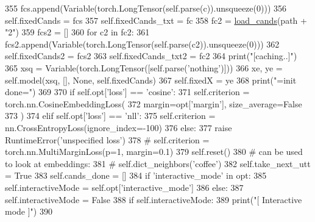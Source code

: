 \begin{DoxyCode}
355                     fcs.append(Variable(torch.LongTensor(self.parse(c)).unsqueeze(0)))
356                 self.fixedCands = fcs
357                 self.fixedCands\_txt = fc
358                 fc2 = \hyperlink{namespaceprojects_1_1personachat_1_1kvmemnn_1_1kvmemnn_a7f44d8ff34857c26b87223a668c43724}{load\_cands}(path + \textcolor{stringliteral}{"2"})
359                 fcs2 = []
360                 \textcolor{keywordflow}{for} c2 \textcolor{keywordflow}{in} fc2:
361                     fcs2.append(Variable(torch.LongTensor(self.parse(c2)).unsqueeze(0)))
362                 self.fixedCands2 = fcs2
363                 self.fixedCands\_txt2 = fc2
364                 print(\textcolor{stringliteral}{"[caching..]"})
365                 xsq = Variable(torch.LongTensor([self.parse(\textcolor{stringliteral}{'nothing'})]))
366                 xe, ye = self.model(xsq, [], \textcolor{keywordtype}{None}, self.fixedCands)
367                 self.fixedX = ye
368             print(\textcolor{stringliteral}{"=init done="})
369 
370         \textcolor{keywordflow}{if} self.opt[\textcolor{stringliteral}{'loss'}] == \textcolor{stringliteral}{'cosine'}:
371             self.criterion = torch.nn.CosineEmbeddingLoss(
372                 margin=opt[\textcolor{stringliteral}{'margin'}], size\_average=\textcolor{keyword}{False}
373             )
374         \textcolor{keywordflow}{elif} self.opt[\textcolor{stringliteral}{'loss'}] == \textcolor{stringliteral}{'nll'}:
375             self.criterion = nn.CrossEntropyLoss(ignore\_index=-100)
376         \textcolor{keywordflow}{else}:
377             \textcolor{keywordflow}{raise} RuntimeError(\textcolor{stringliteral}{'unspecified loss'})
378         \textcolor{comment}{# self.criterion = torch.nn.MultiMarginLoss(p=1, margin=0.1)}
379         self.reset()
380         \textcolor{comment}{# can be used to look at embeddings:}
381         \textcolor{comment}{# self.dict\_neighbors('coffee')}
382         self.take\_next\_utt = \textcolor{keyword}{True}
383         self.cands\_done = []
384         \textcolor{keywordflow}{if} \textcolor{stringliteral}{'interactive\_mode'} \textcolor{keywordflow}{in} opt:
385             self.interactiveMode = self.opt[\textcolor{stringliteral}{'interactive\_mode'}]
386         \textcolor{keywordflow}{else}:
387             self.interactiveMode = \textcolor{keyword}{False}
388         \textcolor{keywordflow}{if} self.interactiveMode:
389             print(\textcolor{stringliteral}{"[ Interactive mode ]"})
390 
\end{DoxyCode}


